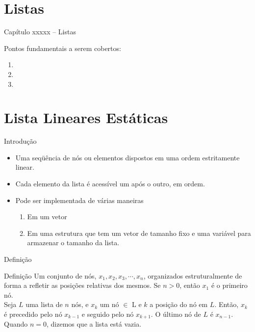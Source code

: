 

\section{Listas}

\begin{frame}
\begin{center}
{\Large Capítulo xxxxx -- Listas}

Pontos fundamentais a serem cobertos:

\begin{enumerate}
  \item 
  \item 
  \item 
\end{enumerate}

\end{center}

\end{frame}



\section{Lista Lineares Estáticas}
  \begin{frame}{Introdução}    
		\begin{itemize}
			\item Uma seqüência de nós ou elementos dispostos em uma ordem estritamente linear.
			\item Cada elemento da lista é acessível um após o outro, em ordem.
			\item Pode ser implementada de várias maneiras			
				\begin{enumerate}
					\item Em um vetor
					\item Em uma estrutura que tem um vetor de tamanho fixo e uma variável para armazenar o tamanho da lista.
				\end{enumerate}
		\end{itemize}
  \end{frame}
  
\begin{frame}{Definição}
     \begin{block}{Definição}
       Um conjunto de nós, $x_1, x_2, x_3, \cdots, x_n$, organizados estruturalmente de forma a refletir as posições relativas dos mesmos. Se $n > 0$, então $x_1$ é o primeiro nó. \\
       Seja $L$ uma lista de $n$ nós, e $x_k$ um nó $\in$ L e $k$ a posição do nó em $L$. Então, $x_k$ é precedido pelo nó $x_{k-1}$ e seguido pelo nó $x_{k+1}$. O último nó de $L$ é $x_{n-1}$. Quando $n = 0$, dizemos que a lista está vazia.
     \end{block}     
\end{frame}

